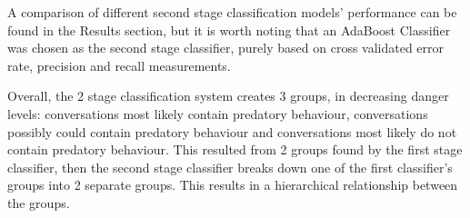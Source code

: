 \documentclass[11pt]{article}
\begin{document}
A comparison of different second stage classification models' performance can be found in the Results section, but it is worth noting that an AdaBoost Classifier \cite{freund1996experiments} was chosen as the second stage classifier, purely based on cross validated error rate, precision and recall measurements.

Overall, the 2 stage classification system creates 3 groups, in decreasing danger levels: conversations most likely contain predatory behaviour,  conversations possibly could contain predatory behaviour and conversations most likely do not contain predatory behaviour. This resulted from 2 groups found by the first stage classifier, then the second stage classifier breaks down one of the first classifier's groups into 2 separate groups. This results in a hierarchical relationship between the groups.
\end{document}
